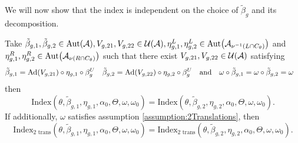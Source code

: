 \documentclass[11pt,a4paper,twoside]{article}
\numberwithin{equation}{section}
\begin{document}
	We will now show that the index is independent on the choice of $\tilde{\beta}_g$ and its decomposition.
	\begin{lemma}\label{lem:InvarianceUnderChoiceBeta}
		Take $\tilde{\beta}_{g,1},\tilde{\beta}_{g,2}\in\Aut{\AA},V_{g,21},V_{g,22}\in\UU(\AA),\eta_{g,1}^L,\eta_{g,2}^L\in \Aut{\AA_{\nu^{-1}(L\cap C_\theta)}}$ and $\eta_{g,1}^R,\eta_{g,2}^R\in \Aut{\AA_{\nu(R\cap C_\theta)}}$ such that there exist $V_{g,21},V_{g,22}\in\mathcal U(\mathcal A)$ satisfying
		\begin{align}\label{eq:InvarianceUnderChoiceBetaTwoBetas}
			\tilde{\beta}_{g,1}&=\Ad{V_{g,21}}\circ\eta_{g,1}\circ\beta^U_g&\tilde{\beta}_{g,2}&=\Ad{V_{g,22}}\circ\eta_{g,2}\circ\beta^U_g&&\text{and}&\omega\circ\tilde{\beta}_{g,1}&=\omega\circ\tilde{\beta}_{g,2}=\omega
		\end{align}then
		\begin{equation}
			\textrm{Index}(\theta,\tilde{\beta}_{g,1},\eta_{g,1},\alpha_{0},\Theta,\omega,\omega_0)=\textrm{Index}(\theta,\tilde{\beta}_{g,2},\eta_{g,2},\alpha_{0},\Theta,\omega,\omega_0).
		\end{equation}
		If additionally, $\omega$ satisfies assumption \ref{assumption:2Translations},	then
		\begin{equation}
			\textrm{Index}_{\text{2 trans}}(\theta,\tilde{\beta}_{g,1},\eta_{g,1},\alpha_{0},\Theta,\omega,\omega_0)=\textrm{Index}_{\text{2 trans}}(\theta,\tilde{\beta}_{g,2},\eta_{g,2},\alpha_{0},\Theta,\omega,\omega_0).
		\end{equation}
	\end{lemma}
\end{document}
